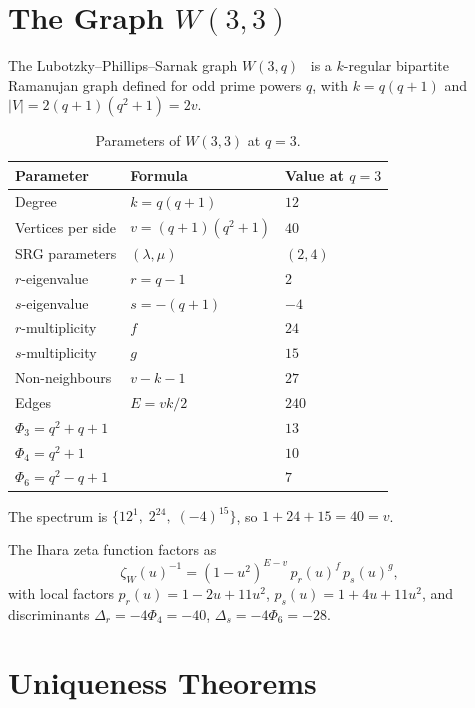 \documentclass[12pt]{article}
\begin{document}
\section{The Graph $W(3,3)$}
\label{sec:graph}

The Lubotzky--Phillips--Sarnak graph $W(3,q)$~\cite{LPS1988} is a
$k$-regular bipartite Ramanujan graph defined for odd prime powers $q$,
with $k = q(q+1)$ and $|V| = 2(q+1)(q^2+1) = 2v$.

\begin{table}[h]
\centering
\begin{tabular}{lll}
\toprule
Parameter & Formula & Value at $q=3$ \\
\midrule
Degree              & $k = q(q+1)$          & $12$ \\
Vertices per side   & $v = (q+1)(q^2+1)$    & $40$ \\
SRG parameters      & $(\lambda, \mu)$      & $(2, 4)$ \\
$r$-eigenvalue      & $r = q-1$             & $2$ \\
$s$-eigenvalue      & $s = -(q+1)$          & $-4$ \\
$r$-multiplicity    & $f$                   & $24$ \\
$s$-multiplicity    & $g$                   & $15$ \\
Non-neighbours      & $v - k - 1$           & $27$ \\
Edges               & $E = vk/2$            & $240$ \\
$\Phi_3 = q^2+q+1$  &                       & $13$ \\
$\Phi_4 = q^2+1$    &                       & $10$ \\
$\Phi_6 = q^2-q+1$  &                       & $7$ \\
\bottomrule
\end{tabular}
\caption{Parameters of $W(3,3)$ at $q=3$.}
\end{table}

The spectrum is $\{12^1,\; 2^{24},\; (-4)^{15}\}$, so $1 + 24 + 15 = 40 = v$.

The Ihara zeta function factors as
\[
  \zeta_{W}(u)^{-1} = (1-u^2)^{E-v}\,p_r(u)^f\,p_s(u)^g,
\]
with local factors $p_r(u) = 1 - 2u + 11u^2$, $p_s(u) = 1 + 4u + 11u^2$,
and discriminants $\Delta_r = -4\Phi_4 = -40$, $\Delta_s = -4\Phi_6 = -28$.

\section{Uniqueness Theorems}
\label{sec:uniqueness}
\end{document}

